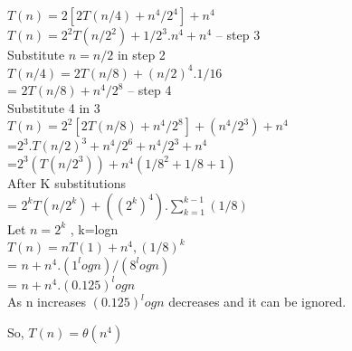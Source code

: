 \documentclass[11pt]{article}
\begin{document}
\begin{enumerate}
$T(n)=2[2T(n/4)+n^4/2^4] + n^4$ \\
$T(n) = 2^2 T(n/2^2) + 1/2^3.n^4+n^4$ -- step 3\\
Substitute  $n=n/2$ in step 2 \\
$T(n/4) = 2T(n/8)+(n/2)^4. 1/16$ \\
        = $2T(n/8) + n^4/2^8$  -- step 4\\

Substitute 4 in 3 \\

$T(n) = 2^2[2T(n/8) + n^4/2^8]+(n^4/2^3)+n^4$ \\
      =$2^3.T(n/2)^3+n^4/2^6+n^4/2^3+n^4 $\\
      =$2^3(T(n/2^3))+n^4(1/8^2 + 1/8 +1)$ \\

After K substitutions \\ 

=  $2^kT(n/2^k)+ ((2^k)^4).\sum_{k=1}^{k-1}(1/8)$ \\

Let $n = 2^k$ , k=logn \\

$T(n) = nT(1)+n^4,(1/8)^k$ \\
      = $n+n^4.(1^log n)/(8^log n)$ \\
      = $n+n^4.(0.125)^log n$ \\

As n increases $(0.125)^log n$ decreases and it can be ignored.

So, $T(n) = \theta(n^4)$











\end{enumerate}
\end{document}
